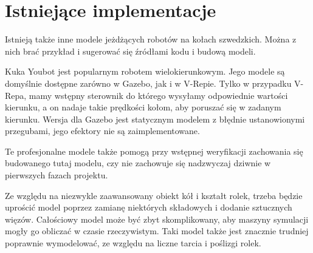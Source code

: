 \section{Istniejące implementacje}
	Istnieją także inne modele jeżdżących robotów na kołach szwedzkich.
	Można z nich brać przykład i sugerować się źródłami kodu i budową modeli.

	Kuka Youbot jest popularnym robotem wielokierunkowym. Jego modele są domyślnie dostępne zarówno w Gazebo, jak i w V-Repie.
	Tylko w przypadku V-Repa, mamy wstępny sterownik do którego wysyłamy odpowiednie wartości kierunku, a on nadaje takie prędkości kołom, aby poruszać się w zadanym kierunku.
	Wersja dla Gazebo jest statycznym modelem z błędnie ustanowionymi przegubami, jego efektory nie są zaimplementowane.

	Te profesjonalne modele także pomogą przy wstępnej weryfikacji zachowania się budowanego tutaj modelu, czy nie zachowuje się nadzwyczaj dziwnie w pierwszych fazach projektu.

	Ze względu na niezwykle zaawansowany obiekt kół i kształt rolek, trzeba będzie uprościć model poprzez zamianę niektórych składowych i dodanie sztucznych więzów.
	Całościowy model może być zbyt skomplikowany, aby maszyny symulacji mogły go obliczać w czasie rzeczywistym.
	Taki model także jest znacznie trudniej poprawnie wymodelować, ze względu na liczne tarcia i poślizgi rolek.
